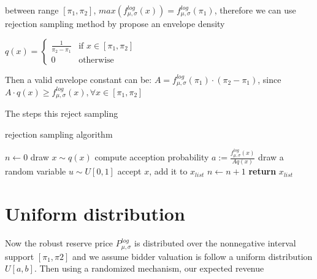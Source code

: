 between range $[\pi_1,\pi_2]$, $ max (f^{log}_{\mu,\sigma} (x)) = f^{log}_{\mu,\sigma} (\pi_1)$, therefore we can use rejection sampling method by propose an envelope density 
\begin{center}
	$q(x) = \begin{cases} \frac{1}{\pi_2 - \pi_1}  & \text{if } x \in [\pi_1, \pi_2] \\ 0   & \text{otherwise } \end{cases}$
\end{center}

Then a valid envelope constant can be: $A = f^{log}_{\mu,\sigma} (\pi_1)\cdot (\pi_2 - \pi_1)$, since $A \cdot q(x) \geqslant	f^{log}_{\mu,\sigma} (x) , 	\forall x \in [\pi_1,\pi_2]$

The steps this reject sampling

\begin{algorithm}
	\caption{rejection sampling algorithm}\label{alg:boundRejection}
	\begin{algorithmic}[1]
		\State $n \gets 0$
			\State draw $x \sim q(x)$		
			\State compute acception probability $a := \frac{f^{log}_{\mu,\sigma} (x) }{Aq(x)}$
			\State draw a random variable $u \sim U[0,1]$
				\State accept $x$, add it to $x_{list}$
				\State $n\gets n+1$	
			\EndIf
		\EndWhile
		\State \textbf{return} $x_{list}$
		\EndProcedure
	\end{algorithmic}
\end{algorithm}

\section{Uniform distribution}
Now the robust reserve price $P^{log}_{\mu,\sigma}$ is distributed over the nonnegative interval support $[\pi_1,\pi2]$ and we assume bidder valuation is follow a uniform distribution $U[a,b]$. Then using a randomized mechanism, our expected revenue 


